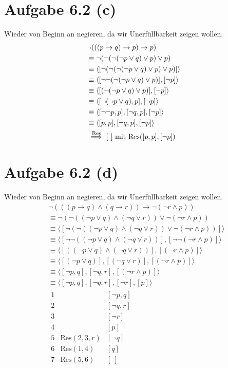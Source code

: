 \documentclass[12pt,a4paper]{article}
\newcommand{\Res}{\text{Res}}
\newcommand{\Reso}{\stackrel{\Res}{\implies}}
\begin{document}
\section*{Aufgabe 6.2 (c)}
Wieder von Beginn an negieren, da wir Unerfüllbarkeit zeigen wollen.
\begin{align*}
&\neg(((p\to q)\to p)\to p)\\
&\equiv
\neg(\neg(\neg(\neg p\vee q)\vee p)\vee p)\\
&\equiv
\langle[\neg(\neg(\neg(\neg p\vee q)\vee p)\vee p)]\rangle\\
&\equiv
\langle[\neg\neg(\neg(\neg p\vee q)\vee p)], [\neg p]\rangle\\
&\equiv
\langle[(\neg(\neg p\vee q)\vee p)], [\neg p]\rangle\\
&\equiv
\langle[\neg(\neg p\vee q), p], [\neg p]\rangle\\
&\equiv
\langle[\neg\neg p, p],[\neg q, p], [\neg p]\rangle\\
&\equiv
\langle[p, p],[\neg q, p], [\neg p]\rangle\\
&\Reso[~]\mit\Res([p,p],[\neg p])
\end{align*}

\section*{Aufgabe 6.2 (d)}
Wieder von Beginn an negieren, da wir Unerfüllbarkeit zeigen wollen.
\begin{align*}
&\neg(((p\to q)\wedge(q\to r))\to\neg(\neg r\wedge p))\\
&\equiv
\neg(\neg((\neg p\vee q)\wedge(\neg q\vee r))\vee\neg(\neg r\wedge p))\\
&\equiv
\langle[\neg(\neg((\neg p\vee q)\wedge(\neg q\vee r))\vee\neg(\neg r\wedge p))]\rangle\\
&\equiv
\langle[\neg\neg((\neg p\vee q)\wedge(\neg q\vee r))],[\neg\neg(\neg r\wedge p)]\rangle\\
&\equiv
\langle[((\neg p\vee q)\wedge(\neg q\vee r))],[(\neg r\wedge p)]\rangle\\
&\equiv
\langle[(\neg p\vee q)],[(\neg q\vee r)],[(\neg r\wedge p)]\rangle\\
&\equiv
\langle[\neg p, q],[\neg q,r],[(\neg r\wedge p)]\rangle\\
&\equiv
\langle[\neg p, q],[\neg q,r],[\neg r],[p]\rangle\\
&\begin{array}{rll}
1 &&[\neg p,q]\\
2 &&[\neg q,r]\\
3 &&[\neg r]\\
4 &&[p]\\
5 & \Res(2,3,r) & [\neg q]\\
6 & \Res(1,4) & [q]\\
7 & \Res(5,6) &[~]
\end{array}
\end{align*}
\end{document}
